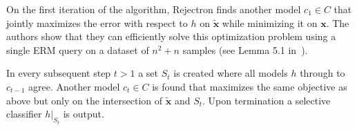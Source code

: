 On the first iteration of the algorithm, Rejectron finds another model $c_1\in C$ that jointly maximizes the error with respect to $h$ on $\tilde{\mathbf{x}}$ while minimizing it on ${\mathbf{x}}$.
The authors show that they can efficiently solve this optimization problem using a single ERM query on a dataset of $n^2+n$ samples (see Lemma 5.1 in~\citeauthor{pqlearn}).

In every subsequent step $t>1$ a set $S_t$ is created where all models $h$ through to $c_{t-1}$ agree.
Another model $c_t\in C$ is found that maximizes the same objective as above but only on the intersection of $\tilde{\mathbf{x}}$ and $S_t$.
Upon termination a selective classifier $\left. h\right|_{S_t}$ is output.